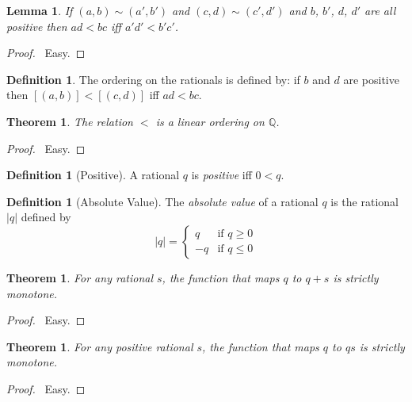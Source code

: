 \documentclass{article}
\let\qed\relax
\newtheorem{lemma}[axiom]{Lemma}
\newtheorem{theorem}[axiom]{Theorem}
\theoremstyle{definition}
\newtheorem{definition}[axiom]{Definition}
\begin{document}
    \begin{lemma}
        If $(a,b) \sim (a',b')$ and $(c,d) \sim (c',d')$ and $b$, $b'$, $d$, $d'$
        are all positive then $ad<bc$ iff $a'd'<b'c'$.
    \end{lemma}

    \begin{proof}
        \pf\ Easy.
    \end{proof}

    \begin{definition}
        The ordering on the rationals is defined by: if $b$ and $d$ are positive then
        $[(a,b)] < [(c,d)]$ iff $ad < bc$.
    \end{definition}

    \begin{theorem}
        The relation $<$ is a linear ordering on $\mathbb{Q}$.
    \end{theorem}

    \begin{proof}
        \pf\ Easy. \qed
    \end{proof}

    \begin{definition}[Positive]
        A rational $q$ is \emph{positive} iff $0 < q$.
    \end{definition}

    \begin{definition}[Absolute Value]
        The \emph{absolute value} of a rational $q$ is the rational $|q|$ defined by
        \[ |q| = \begin{cases}
            q & \text{if } q \geq 0 \\
            -q & \text{if } q \leq 0
        \end{cases} \]
    \end{definition}

    \begin{theorem}
        For any rational $s$, the function that maps $q$ to $q + s$ is strictly monotone.
    \end{theorem}
    
    \begin{proof}
        \pf\ Easy. \qed
    \end{proof}

    \begin{theorem}
        For any positive rational $s$, the function that maps $q$ to $qs$ is strictly monotone.
    \end{theorem}

    \begin{proof}
        \pf\ Easy. \qed
    \end{proof}
\end{document}
